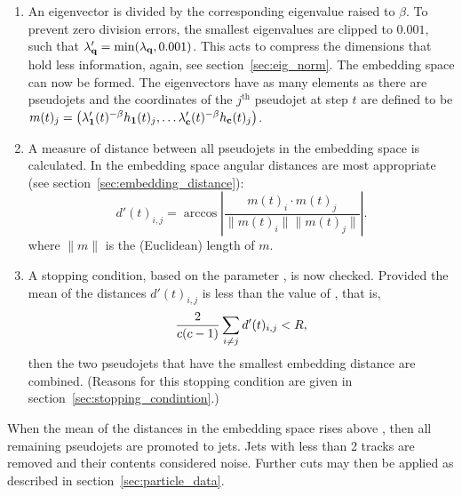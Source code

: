 \begin{enumerate}
        \item \label{step:compression} An eigenvector is divided by the corresponding eigenvalue raised to \(\beta\).
            To prevent zero division errors, the smallest eigenvalues are clipped to \(0.001\),
            such that \(\lambda'_{\textbf{q}} = \min(\lambda_{\textbf{q}}, 0.001)\).
            This acts to compress the dimensions that hold less information, again, see section~\ref{sec:eig_norm}.
            The embedding space can now be formed.
            The eigenvectors have as many elements as there are pseudojets and the coordinates of
            the \(j^\text{th}\) pseudojet at step \(t\)
            are defined to be
            \(m(t)_j = \left(\lambda'_{\textbf{1}}(t)^{-\beta} h_{\textbf{1}}(t)_j, \dots \lambda'_{\textbf{c}}(t)^{-\beta} h_{\textbf{c}}(t)_j\right)\).

        \item  A measure of distance between all pseudojets in the embedding space is calculated.
            In the embedding space angular distances are most appropriate (see section~\ref{sec:embedding_distance}):
            \begin{equation}
                d'(t)_{i, j} = \arccos\left|\frac{m(t)_i\cdot m(t)_j}{\|m(t)_i\| \|m(t)_j\|}\right|.
            \end{equation}
            where \(\|m\|\) is the (Euclidean) length of \(m\).

        \item\label{step:stoppingcondition}

            A stopping condition, based on the parameter \stoppingdeltar{}, is now checked.
            Provided the mean of the distances \(d'(t)_{i, j}\) is less than 
            the value of \stoppingdeltar{}, that is,
            \begin{equation}
                \frac{2}{c(c-1)}\sum_{i\ne j} d'(t)_{i, j} < R{},
            \end{equation}
            then the two pseudojets that have the smallest embedding distance are combined.
            (Reasons for this stopping condition are given in section~\ref{sec:stopping_condintion}.)
        
     \end{enumerate}
    When the mean of the distances in the embedding space rises above \stoppingdeltar{},
    then all remaining pseudojets are promoted to jets.
    Jets with less than 2 tracks are removed and their contents considered noise.
    Further cuts may then be applied as described in section~\ref{sec:particle_data}.

